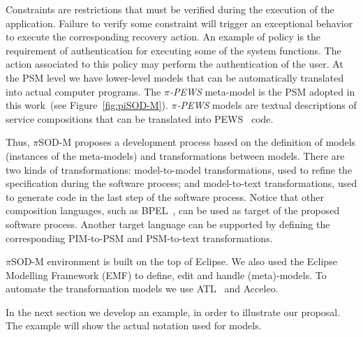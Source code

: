 Constraints are restrictions that must be verified during the execution of the application. 
Failure to verify some constraint will trigger an exceptional behavior to execute the corresponding recovery action.
An example of policy is the requirement of authentication for executing some of the system functions. 
The action associated to this policy may perform the authentication of the user.
%
At the PSM level we have lower-level models that can be automatically translated into actual computer programs.
The \textit{$\pi$-PEWS} meta-model is the PSM adopted in this work~(see Figure~\ref{fig:piSOD-M}).
\textit{$\pi$-PEWS} models are textual descriptions of service compositions that can be translated into PEWS~\cite{BHM06} %
code.





%
Thus, $\pi$SOD-M proposes a development process based on the definition of models
(instances of the meta-models) and transformations between models.
There are two kinds of transformations:
model-to-model transformations, used to refine the specification during the software process; and
model-to-text transformations, used   to generate code in the last step of the software process.
Notice that other composition languages, such as BPEL~\cite{bpel03}, can be used as target of the proposed software process. Another target language can be supported by defining the corresponding PIM-to-PSM and PSM-to-text transformations.



$\pi$SOD-M environment is built on the top of Eclipse. 
We also used the Eclipse Modelling Framework (EMF) to define, edit and handle
(meta)-models. 
To automate the transformation models we use ATL~\cite{atl_manual} and Acceleo.

In the next section we develop an example, in order to illustrate our proposal.
The example will show the actual notation used for models. 





